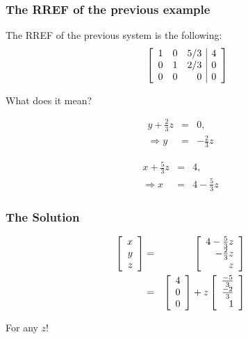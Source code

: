 \begin{frame}
  \frametitle{The RREF of the previous example}

  The RREF of the previous system is the following:
  \begin{eqnarray*}
    \stateThree{~}{~}{~}
    \startRowOps
    \oneRowOps{1}{0}{5/3}{4} 
    \oneRowOps{0}{1}{2/3}{0} 
    \oneRowOps{0}{0}{0}{0} 
    \stopRowOps    
  \end{eqnarray*}

  What does it mean?

  \begin{eqnarray*}
    y + \frac{2}{3}z & = & 0, \\
    \Rightarrow y & = & -\frac{2}{3} z
  \end{eqnarray*}

  {
    \begin{eqnarray*}
      x + \frac{5}{3} z & = & 4, \\
      \Rightarrow x & = & 4 - \frac{5}{3} z
    \end{eqnarray*}
  }

\end{frame}

\begin{frame}
  \frametitle{The Solution}

  \begin{eqnarray*}
    \left[ \begin{array}{r} x \\ y \\ z \end{array} \right] & = & \left[ \begin{array}{r} 4 - \frac{5}{3}z \\ -\frac{2}{3}z \\ z \end{array} \right] \\
    & = & \left[ \begin{array}{r} 4 \\ 0 \\ 0 \end{array} \right] + z \left[ \begin{array}{r} \frac{-5}{3} \\ \frac{-2}{3} \\ 1 \end{array} \right]
  \end{eqnarray*}

  For any $z$!
  
\end{frame}


